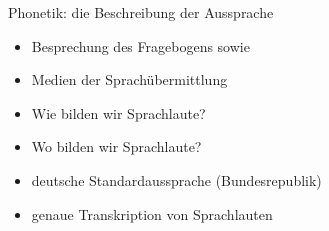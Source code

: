 \begin{frame}
  {Phonetik: die Beschreibung der Aussprache}

  \begin{itemize}[<+->]
    \item Besprechung des Fragebogens sowie \citet{SchaeferSayatz2017a}
      \Zeile
    \item Medien der Sprachübermittlung
    \item Wie bilden wir Sprachlaute?
    \item Wo bilden wir Sprachlaute?
    \item deutsche Standardaussprache (Bundesrepublik)
    \item genaue Transkription von Sprachlauten
  \end{itemize}
  \pause
  \Halbzeile
  \begin{center}
  \end{center}

  \pause
  \pause
  \pause
  \pause
  \pause
\end{frame}
